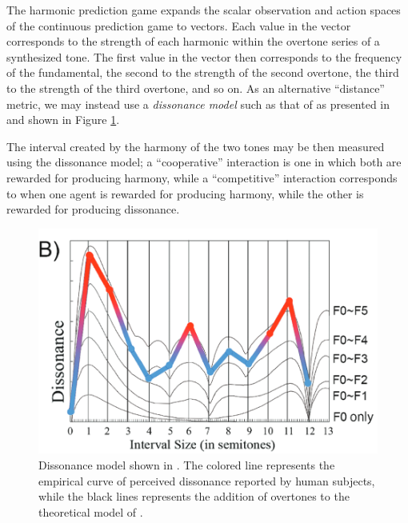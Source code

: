 \documentclass{article}
\begin{document}
The harmonic prediction game expands the scalar observation and action spaces of the continuous 
prediction game to vectors. Each value in the vector corresponds to the strength of each harmonic
within the overtone series of a synthesized tone. The first value in the vector then corresponds 
to the frequency of the fundamental, the second to the strength of the second overtone, 
the third to the strength of the third overtone, and so on. As an alternative ``distance''
metric, we may instead use a \textit{dissonance model} such as that of \citet{sethares2005}
as presented in \citet{cook2017} and shown in Figure \ref{cook}.

The interval created by the harmony of the two tones 
may be then measured using the dissonance model; a ``cooperative''
interaction is one in which both are rewarded for producing harmony, 
while a ``competitive'' interaction corresponds
to when one agent is rewarded for producing harmony, while the other is 
rewarded for producing dissonance.

\begin{figure}[H]
    \begin{center}
        \includegraphics[width=4.5in]{cook.png}
        \caption{Dissonance model shown in \citet{cook2017}. The colored line represents the 
        empirical curve of perceived dissonance reported by human subjects, while the black 
        lines represents the addition of 
        overtones to the theoretical model of \citet{sethares2005}.}
        \label{cook}
    \end{center}
\end{figure}
\end{document}
